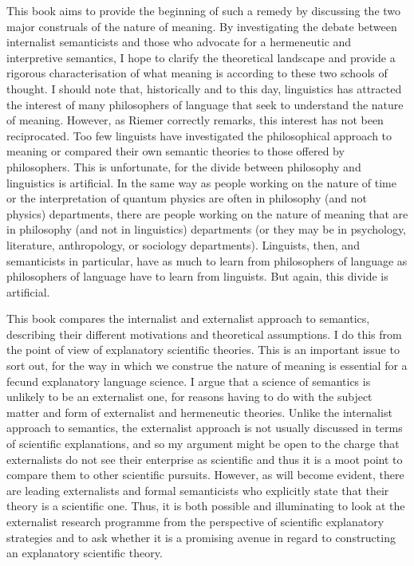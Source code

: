 \begin{refsection}
This book aims to provide the beginning of such a remedy by discussing the two major construals of the nature of meaning. By investigating the debate between internalist semanticists and those who advocate for a hermeneutic and interpretive semantics, I hope to clarify the theoretical landscape and provide a rigorous characterisation of what meaning is according to these two schools of thought. I should note that, historically and to this day, linguistics has attracted the interest of many philosophers of language that seek to understand the nature of meaning. However, as Riemer correctly remarks, this interest has not been reciprocated. Too few linguists have investigated the philosophical approach to meaning or compared their own semantic theories to those offered by philosophers. This is unfortunate, for the divide between philosophy and linguistics is artificial. In the same way as people working on the nature of time or the interpretation of quantum physics are often in philosophy (and not physics) departments, there are people working on the nature of meaning that are in philosophy (and not in linguistics) departments (or they may be in psychology, literature, anthropology, or sociology departments). Linguists, then, and semanticists in particular, have as much to learn from philosophers of language as philosophers of language have to learn from linguists. But again, this divide is artificial. 

This book compares the internalist and externalist approach to semantics, describing their different motivations and theoretical assumptions. I do this from the point of view of explanatory scientific theories. This is an important issue to sort out, for the way in which we construe the nature of meaning is essential for a fecund explanatory language science. I argue that a science of semantics is unlikely to be an externalist one, for reasons having to do with the subject matter and form of externalist and hermeneutic theories. Unlike the internalist approach to semantics, the externalist approach is not usually discussed in terms of scientific explanations, and so my argument might be open to the charge that externalists do not see their enterprise as scientific and thus it is a moot point to compare them to other scientific pursuits. However, as will become evident, there are leading externalists and formal semanticists who explicitly state that their theory is a scientific one. Thus, it is both possible and illuminating to look at the externalist research programme from the perspective of scientific explanatory strategies and to ask whether it is a promising avenue in regard to constructing an explanatory scientific theory.


\end{refsection}
